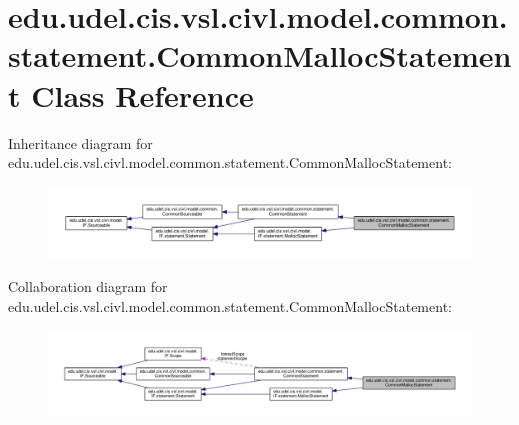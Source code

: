 \hypertarget{classedu_1_1udel_1_1cis_1_1vsl_1_1civl_1_1model_1_1common_1_1statement_1_1CommonMallocStatement}{}\section{edu.\+udel.\+cis.\+vsl.\+civl.\+model.\+common.\+statement.\+Common\+Malloc\+Statement Class Reference}
\label{classedu_1_1udel_1_1cis_1_1vsl_1_1civl_1_1model_1_1common_1_1statement_1_1CommonMallocStatement}


Inheritance diagram for edu.\+udel.\+cis.\+vsl.\+civl.\+model.\+common.\+statement.\+Common\+Malloc\+Statement\+:
\nopagebreak
\begin{figure}[H]
\begin{center}
\leavevmode
\includegraphics[width=350pt]{classedu_1_1udel_1_1cis_1_1vsl_1_1civl_1_1model_1_1common_1_1statement_1_1CommonMallocStatement__inherit__graph}
\end{center}
\end{figure}


Collaboration diagram for edu.\+udel.\+cis.\+vsl.\+civl.\+model.\+common.\+statement.\+Common\+Malloc\+Statement\+:
\nopagebreak
\begin{figure}[H]
\begin{center}
\leavevmode
\includegraphics[width=350pt]{classedu_1_1udel_1_1cis_1_1vsl_1_1civl_1_1model_1_1common_1_1statement_1_1CommonMallocStatement__coll__graph}
\end{center}
\end{figure}
